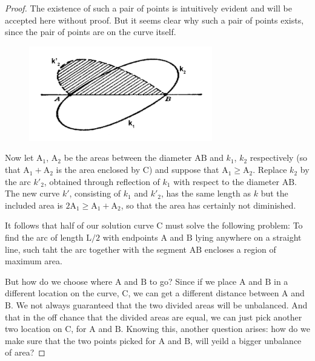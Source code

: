 \documentclass[a4paper]{book}
\numberwithin{theorem}{section}%
\begin{document}
\begin{proof}
    The existence of such a pair of points is intuitively evident and will be accepted here without proof. But it seems clear why such a pair of points exists, since the pair of points are on the curve itself.
    \begin{figure}[hbt!]
        \begin{center}   
            \includegraphics[width=80mm]{steiner2}
            \caption{}
        \end{center}
    \end{figure}\leavevmode\newline
    Now let $\mathrm{A}_{1}$, $\mathrm{A}_{2}$ be the areas between the diameter $\mathrm{AB}$ and $k_{1}$, $k_{2}$ respectively (so that $\mathrm{A}_{1}+\mathrm{A}_{2}$ is the area enclosed by $\mathrm{C}$) and suppose that $\mathrm{A}_{1}\geq\mathrm{A}_{2}$. Replace $k_{2}$ by the arc $k'_{2}$, obtained through reflection of $k_{1}$ with respect to the diameter $\mathrm{AB}$. The new curve $k'$, consisting of $k_{1}$ and $k'_{2}$, has the same length as $k$ but the included area is $2\mathrm{A}_{1}\geq\mathrm{A}_{1}+\mathrm{A}_{2}$, so that the area has certainly not diminished.

    It follows that half of our solution curve $\mathrm{C}$ must solve the following problem: To find the arc of length $\mathrm{L}/2$ with endpoints $\mathrm{A}$ and $\mathrm{B}$ lying anywhere on a straight line, such taht the arc together with the segment $\mathrm{AB}$ encloses a region of maximum area.

    But how do we choose where $\mathrm{A}$ and $\mathrm{B}$ to go? Since if we place $\mathrm{A}$ and $\mathrm{B}$ in a different location on the curve, $\mathrm{C}$, we can get a different distance between $\mathrm{A}$ and $\mathrm{B}$. We not always guaranteed that the two divided areas will be unbalanced. And that in the off chance that the divided areas are equal, we can just pick another two location on $\mathrm{C}$, for $\mathrm{A}$ and $\mathrm{B}$. Knowing this, another question arises: how do we make sure that the two points picked for $\mathrm{A}$ and $\mathrm{B}$, will yeild a bigger unbalance of area?


\end{proof}
\end{document}
